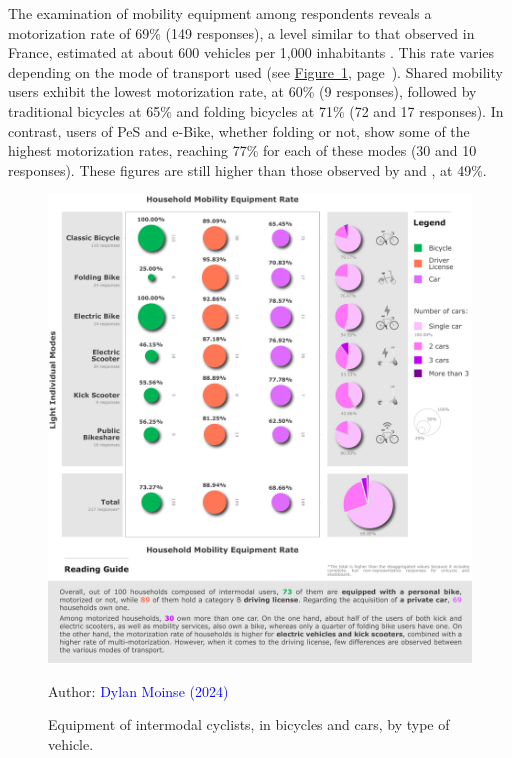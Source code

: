 \begin{refsegment}
The examination of mobility equipment among respondents reveals a motorization rate of 69\% (149 responses), a level similar to that observed in France, estimated at about 600 vehicles per 1,000 inhabitants \textcolor{blue}{\autocite{insee_equipement_2020}}. This rate varies depending on the mode of transport used (see \hyperref[fig-chap4:equipement]{Figure~\ref{fig-chap4:equipement}}, page~\pageref{fig-chap4:equipement}). Shared mobility users exhibit the lowest motorization rate, at 60\% (9 responses), followed by traditional bicycles at 65\% and folding bicycles at 71\% (72 and 17 responses). In contrast, users of \acrshort{PeS} and \acrshort{e-Bike}, whether folding or not, show some of the highest motorization rates, reaching 77\% for each of these modes (30 and 10 responses). These figures are still higher than those observed by \textcolor{blue}{\textcite[362]{givoni_access_2007}} and \textcolor{blue}{\textcite[7]{yang_empirical_2016}}, at 49\%.%

    \begin{figure}[h!]\vspace*{4pt}
        \caption{Equipment of intermodal cyclists, in bicycles and cars, by type of vehicle.}
        \label{fig-chap4:equipement}
        \centerline{\includegraphics[width=1\columnwidth]{src/Figures/Chap-4/EN_Taux_motorisation.pdf}}
        \vspace{5pt}
        \begin{flushright}\scriptsize{
        Author: \textcolor{blue}{Dylan Moinse (2024)}
        }\end{flushright}
    \end{figure}


\end{refsegment}
